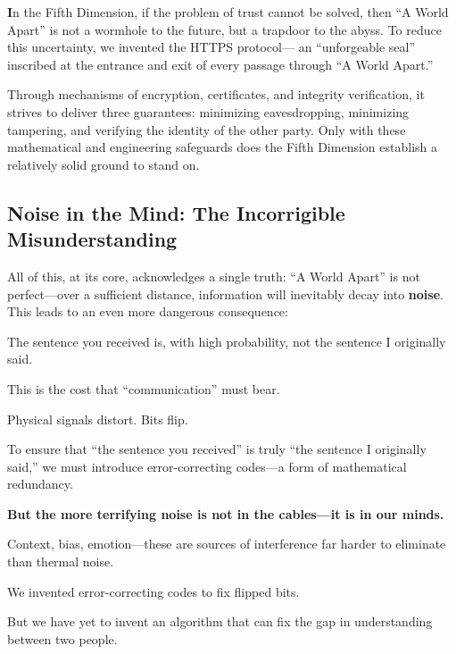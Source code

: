 \textbf{I}n the Fifth Dimension, if the problem of trust cannot be solved, then ``A World Apart'' is not a wormhole to the future, but a trapdoor to the abyss.
To reduce this uncertainty, we invented the HTTPS protocol---
an ``unforgeable seal'' inscribed at the entrance and exit of every passage through ``A World Apart.''

\vspace{1em}

Through mechanisms of encryption, certificates, and integrity verification, it strives to deliver three guarantees: minimizing eavesdropping, minimizing tampering, and verifying the identity of the other party. Only with these mathematical and engineering safeguards does the Fifth Dimension establish a relatively solid ground to stand on.

\subsection{Noise in the Mind: The Incorrigible Misunderstanding}
All of this, at its core, acknowledges a single truth: ``A World Apart'' is not perfect---over a sufficient distance, information will inevitably decay into \textbf{noise}.
This leads to an even more dangerous consequence:

\begin{myquote}The sentence you received is, with high probability, not the sentence I originally said.\end{myquote}

This is the cost that ``communication'' must bear.

Physical signals distort. Bits flip.

\vspace{1em}

To ensure that ``the sentence you received'' is truly ``the sentence I originally said,'' we must introduce error-correcting codes---a form of mathematical redundancy.

\vspace{1em}

\textbf{But the more terrifying noise is not in the cables---it is in our minds.}

Context, bias, emotion---these are sources of interference far harder to eliminate than thermal noise.

We invented error-correcting codes to fix flipped bits.

But we have yet to invent an algorithm that can fix the gap in understanding between two people.

